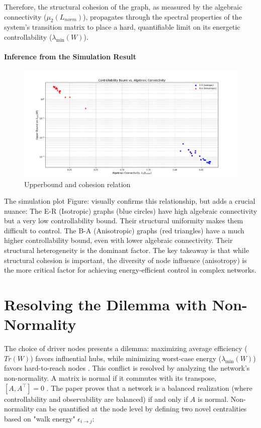 \documentclass[10pt, a4paper]{article}
\begin{document}
\vspace{1em}
\noindent Therefore, the structural cohesion of the graph, as measured by the algebraic connectivity ($\mu_2(L_{norm})$), propagates through the spectral properties of the system's transition matrix to place a hard, quantifiable limit on its energetic controllability ($\lambda_{\min}(W)$).
\paragraph{Inference from the Simulation Result}
\begin{figure}[h]
    \centering
    \includegraphics[width=1\linewidth]{sim.png}
    \caption{Upperbound and cohesion relation}
    \label{fig:sim_result}
\end{figure}
The simulation plot Figure:  visually confirms  this relationship, but adds a crucial nuance:
The E-R (Isotropic) graphs (blue circles) have high algebraic connectivity but a very low controllability bound. Their structural uniformity makes them difficult to control. The B-A (Anisotropic) graphs (red triangles) have a much higher controllability bound, even with lower algebraic connectivity. Their structural heterogeneity is the dominant factor.
The key takeaway is that while structural cohesion is important, the diversity of node influence (anisotropy) is the more critical factor for achieving energy-efficient control in complex networks.
\section{Resolving the Dilemma with Non-Normality}
The choice of driver nodes presents a dilemma: maximizing average efficiency ($Tr(W)$) favors influential hubs, while minimizing worst-case energy ($\lambda_{\min}(W)$) favors hard-to-reach nodes . This conflict is resolved by analyzing the network's non-normality.
A matrix is normal if it commutes with its transpose, $[A, A^\top] = 0$ . The paper proves that a network is a balanced realization (where controllability and observability are balanced) if and only if $A$ is normal. Non-normality can be quantified at the node level by defining two novel centralities based on "walk energy" $\epsilon_{i \to j}$:
\end{document}
